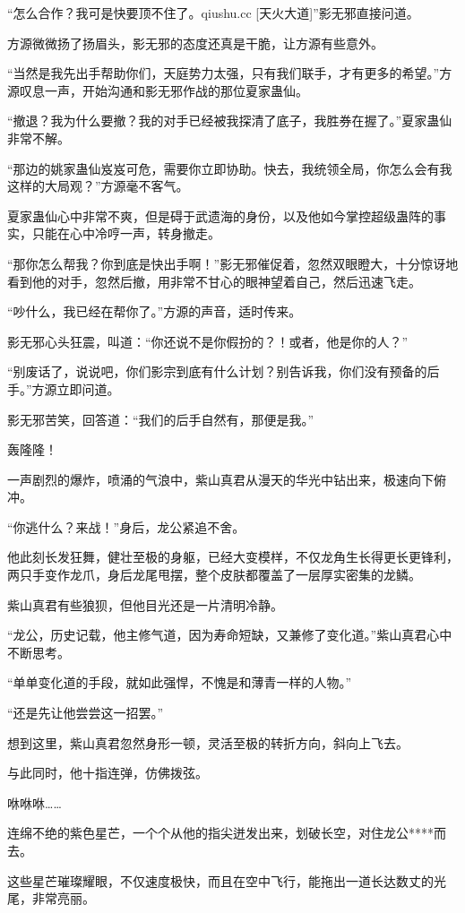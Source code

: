 \begin{this_body}
“怎么合作？我可是快要顶不住了。qiushu.cc [天火大道]”影无邪直接问道。

方源微微扬了扬眉头，影无邪的态度还真是干脆，让方源有些意外。

“当然是我先出手帮助你们，天庭势力太强，只有我们联手，才有更多的希望。”方源叹息一声，开始沟通和影无邪作战的那位夏家蛊仙。

“撤退？我为什么要撤？我的对手已经被我探清了底子，我胜券在握了。”夏家蛊仙非常不解。

“那边的姚家蛊仙岌岌可危，需要你立即协助。快去，我统领全局，你怎么会有我这样的大局观？”方源毫不客气。

夏家蛊仙心中非常不爽，但是碍于武遗海的身份，以及他如今掌控超级蛊阵的事实，只能在心中冷哼一声，转身撤走。

“那你怎么帮我？你到底是快出手啊！”影无邪催促着，忽然双眼瞪大，十分惊讶地看到他的对手，忽然后撤，用非常不甘心的眼神望着自己，然后迅速飞走。

“吵什么，我已经在帮你了。”方源的声音，适时传来。

影无邪心头狂震，叫道：“你还说不是你假扮的？！或者，他是你的人？”

“别废话了，说说吧，你们影宗到底有什么计划？别告诉我，你们没有预备的后手。”方源立即问道。

影无邪苦笑，回答道：“我们的后手自然有，那便是我。”

轰隆隆！

一声剧烈的爆炸，喷涌的气浪中，紫山真君从漫天的华光中钻出来，极速向下俯冲。

“你逃什么？来战！”身后，龙公紧追不舍。

他此刻长发狂舞，健壮至极的身躯，已经大变模样，不仅龙角生长得更长更锋利，两只手变作龙爪，身后龙尾甩摆，整个皮肤都覆盖了一层厚实密集的龙鳞。

紫山真君有些狼狈，但他目光还是一片清明冷静。

“龙公，历史记载，他主修气道，因为寿命短缺，又兼修了变化道。”紫山真君心中不断思考。

“单单变化道的手段，就如此强悍，不愧是和薄青一样的人物。”

“还是先让他尝尝这一招罢。”

想到这里，紫山真君忽然身形一顿，灵活至极的转折方向，斜向上飞去。

与此同时，他十指连弹，仿佛拨弦。

咻咻咻……

连绵不绝的紫色星芒，一个个从他的指尖迸发出来，划破长空，对住龙公****而去。

这些星芒璀璨耀眼，不仅速度极快，而且在空中飞行，能拖出一道长达数丈的光尾，非常亮丽。


\end{this_body}
